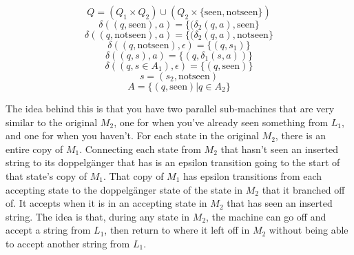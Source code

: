 \documentclass[11pt]{article}
\begin{document}
\begin{solution}
    \[
        Q = (Q_1 \times Q_2) \cup (Q_2 \times \{\text{seen}, \text{notseen}\})
    \]
    \[
        \delta((q, \text{seen}), a) = \{(\delta_2(q, a), \text{seen}\}
    \]
    \[
        \delta((q, \text{notseen}), a) = \{(\delta_2(q, a), \text{notseen}\}
    \]
    \[
        \delta((q, \text{notseen}), \epsilon) = \{(q, s_1)\}
    \]
    \[
        \delta((q, s), a) = \{(q, \delta_1(s, a))\}
    \]
    \[
        \delta((q, s \in A_1), \epsilon) = \{(q, \text{seen})\}
    \]
    \[
        s = (s_2, \text{notseen})
    \]
    \[
        A = \{(q, \text{seen}) | q \in A_2\}
    \]

    The idea behind this is that you have two parallel sub-machines that are very similar to the original $M_2$, one for when you've already seen something from $L_1$, and one for when you haven't. For each state in the original $M_2$, there is an entire copy of $M_1$. Connecting each state from $M_2$ that hasn't seen an inserted string to its doppelg{\"a}nger that has is an epsilon transition going to the start of that state's copy of $M_1$. That copy of $M_1$ has epsilon transitions from each accepting state to the doppelg{\"a}nger state of the state in $M_2$ that it branched off of. It accepts when it is in an accepting state in $M_2$ that has seen an inserted string. The idea is that, during any state in $M_2$, the machine can go off and accept a string from $L_1$, then return to where it left off in $M_2$ without being able to accept another string from $L_1$.
\end{solution}
\end{document}
